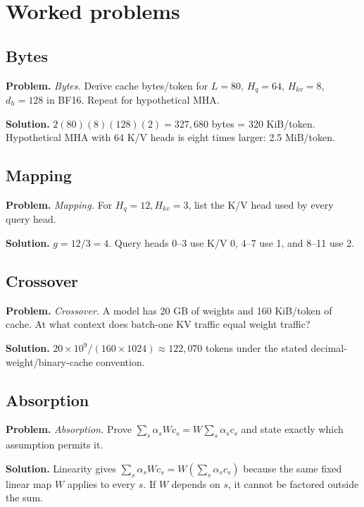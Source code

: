 \section{Worked problems}

\subsection{Bytes}
\textbf{Problem.} \emph{Bytes.} Derive cache bytes/token for $L=80$, $H_q=64$, $H_{kv}=8$,
$d_h=128$ in BF16. Repeat for hypothetical MHA.

\textbf{Solution.} $2(80)(8)(128)(2)=327{,}680$ bytes = 320 KiB/token. Hypothetical
MHA with 64 K/V heads is eight times larger: 2.5 MiB/token.

\subsection{Mapping}
\textbf{Problem.} \emph{Mapping.} For $H_q=12,H_{kv}=3$, list the K/V head used by every query head.

\textbf{Solution.} $g=12/3=4$. Query heads 0--3 use K/V 0, 4--7 use 1, and 8--11
use 2.

\subsection{Crossover}
\textbf{Problem.} \emph{Crossover.} A model has 20 GB of weights and 160 KiB/token of cache. At what
context does batch-one KV traffic equal weight traffic?

\textbf{Solution.} $20\times10^9/(160\times1024)\approx122{,}070$ tokens under the
stated decimal-weight/binary-cache convention.

\subsection{Absorption}
\textbf{Problem.} \emph{Absorption.} Prove
$\sum_s\alpha_sWc_s=W\sum_s\alpha_sc_s$ and state exactly which assumption permits it.

\textbf{Solution.} Linearity gives
$\sum_s\alpha_sWc_s=W(\sum_s\alpha_sc_s)$ because the same fixed linear map $W$
applies to every $s$. If $W$ depends on $s$, it cannot be factored outside the sum.
